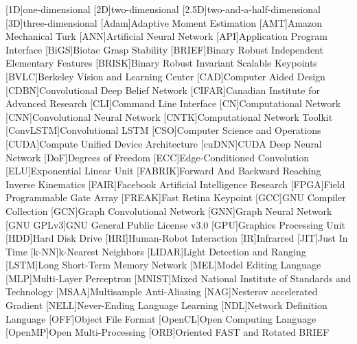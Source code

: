 \begin{acronym}
	[1D]{one-dimensional}
	[2D]{two-dimensional}
	[2.5D]{two-and-a-half-dimensional}
	[3D]{three-dimensional}
	[Adam]{Adaptive Moment Estimation}
	[AMT]{Amazon Mechanical Turk}
	[ANN]{Artificial Neural Network}
    [API]{Application Program Interface}
    [BiGS]{Biotac Grasp Stability}
	[BRIEF]{Binary Robust Independent Elementary Features}
	[BRISK]{Binary Robust Invariant Scalable Keypoints}
	[BVLC]{Berkeley Vision and Learning Center}
	[CAD]{Computer Aided Design}
	[CDBN]{Convolutional Deep Belief Network}
	[CIFAR]{Canadian Institute for Advanced Research}
	[CLI]{Command Line Interface}
	[CN]{Computational Network}
	[CNN]{Convolutional Neural Network}
    [CNTK]{Computational Network Toolkit}
    [ConvLSTM]{Convolutional LSTM}
	[CSO]{Computer Science and Operations}
	[CUDA]{Compute Unified Device Architecture}
    [cuDNN]{CUDA Deep Neural Network}
    [DoF]{Degrees of Freedom}
    [ECC]{Edge-Conditioned Convolution}
    [ELU]{Exponential Linear Unit}
    [FABRIK]{Forward And Backward Reaching Inverse Kinematics}
	[FAIR]{Facebook Artificial Intelligence Research}
    [FPGA]{Field Programmable Gate Array}
	[FREAK]{Fast Retina Keypoint}
    [GCC]{GNU Compiler Collection}
    [GCN]{Graph Convolutional Network}
    [GNN]{Graph Neural Network}
	[GNU GPLv3]{GNU General Public License v3.0}
	[GPU]{Graphics Processing Unit}
    [HDD]{Hard Disk Drive}
    [HRI]{Human-Robot Interaction}
	[IR]{Infrarred}
    [JIT]{Just In Time}
    [k-NN]{k-Nearest Neighbors}
    [LIDAR]{Light Detection and Ranging}
    [LSTM]{Long Short-Term Memory Network}
	[MEL]{Model Editing Language}
	[MLP]{Multi-Layer Perceptron}
    [MNIST]{Mixed National Institute of Standards and Technology}
    [MSAA]{Multisample Anti-Aliasing}
    [NAG]{Nesterov accelerated Gradient}
    [NELL]{Never-Ending Language Learning}
	[NDL]{Network Definition Language}
	[OFF]{Object File Format}
	[OpenCL]{Open Computing Language}
	[OpenMP]{Open Multi-Processing}
    [ORB]{Oriented FAST and Rotated BRIEF}

\end{acronym}
